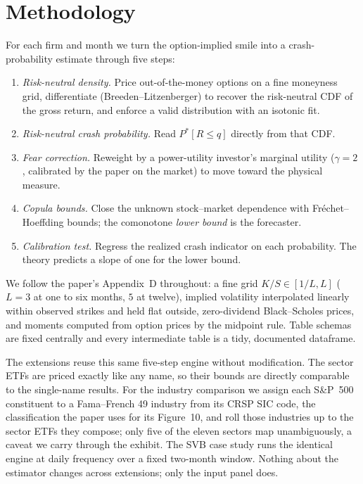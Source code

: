 \documentclass[12pt]{article}
\begin{document}
\section{Methodology}
For each firm and month we turn the option-implied smile into a crash-probability
estimate through five steps:

\begin{enumerate}
  \item \emph{Risk-neutral density.} Price out-of-the-money options on a fine
    moneyness grid, differentiate (Breeden--Litzenberger) to recover the
    risk-neutral CDF of the gross return, and enforce a valid distribution with an
    isotonic fit.
  \item \emph{Risk-neutral crash probability.} Read $P^{*}[R \le q]$ directly from
    that CDF.
  \item \emph{Fear correction.} Reweight by a power-utility investor's marginal
    utility ($\gamma = 2$, calibrated by the paper on the market) to move toward
    the physical measure.
  \item \emph{Copula bounds.} Close the unknown stock--market dependence with
    Fr\'echet--Hoeffding bounds; the comonotone \emph{lower bound} is the
    forecaster.
  \item \emph{Calibration test.} Regress the realized crash indicator on each
    probability. The theory predicts a slope of one for the lower bound.
\end{enumerate}

We follow the paper's Appendix~D throughout: a fine grid $K/S \in [1/L, L]$
($L = 3$ at one to six months, $5$ at twelve), implied volatility interpolated
linearly within observed strikes and held flat outside, zero-dividend
Black--Scholes prices, and moments computed from option prices by the midpoint
rule. Table schemas are fixed centrally and every intermediate table is a tidy,
documented dataframe.

The extensions reuse this same five-step engine without modification. The sector
ETFs are priced exactly like any name, so their bounds are directly comparable to
the single-name results. For the industry comparison we assign each S\&P~500
constituent to a Fama--French 49 industry from its CRSP SIC code, the
classification the paper uses for its Figure~10, and roll those industries up to
the sector ETFs they compose; only five of the eleven sectors map unambiguously, a
caveat we carry through the exhibit. The SVB case study runs the identical engine at
daily frequency over a fixed two-month window. Nothing about the estimator changes
across extensions; only the input panel does.
\end{document}
